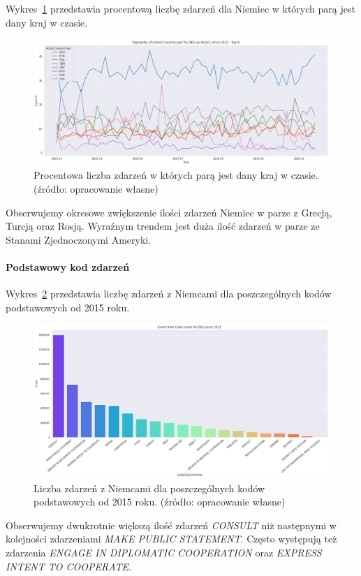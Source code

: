 \documentclass[11pt]{report}
\begin{document}
    Wykres~\ref{fig:DEUpairPerc} przedstawia procentową liczbę zdarzeń dla Niemiec w których parą jest dany kraj w czasie.
    \begin{figure}[!htp]
        \centering
        \includegraphics[width=\linewidth]{fig/DEU/DEUactor2PairPercinTIME.png}
        \caption{Procentowa liczba zdarzeń w których parą jest dany kraj w czasie. (źródło: opracowanie własne)}
        \label{fig:DEUpairPerc}
    \end{figure}
    Obserwujemy okresowe zwiększenie ilości zdarzeń Niemiec w parze z Grecją, Turcją oraz Rosją.
    Wyraźnym trendem jest duża ilość zdarzeń w parze ze Stanami Zjednoczonymi Ameryki.

    \paragraph{Podstawowy kod zdarzeń}

    Wykres~\ref{fig:DEUPERC} przedstawia liczbę zdarzeń z Niemcami dla poszczególnych kodów podstawowych od 2015 roku.
    \begin{figure}[!htp]
        \centering
        \includegraphics[width=\linewidth]{fig/DEU/DEUERC.png}
        \caption{Liczba zdarzeń z Niemcami dla poszczególnych kodów podstawowych od 2015 roku. (źródło: opracowanie własne)}
        \label{fig:DEUPERC}
    \end{figure}
    Obserwujemy dwukrotnie większą ilość zdarzeń \textit{CONSULT} niż następnymi w kolejności zdarzeniami \textit{MAKE PUBLIC STATEMENT}.
    Często występują też zdarzenia \textit{ENGAGE IN DIPLOMATIC COOPERATION} oraz \textit{EXPRESS INTENT TO COOPERATE}.
\end{document}
